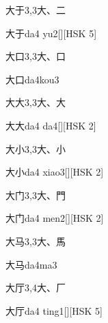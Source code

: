\begin{entry}{大于}{3,3}{⼤、⼆}
  \begin{phonetics}{大于}{da4 yu2}[][HSK 5]
  \end{phonetics}
\end{entry}

\begin{entry}{大口}{3,3}{⼤、⼝}
  \begin{phonetics}{大口}{da4kou3}
  \end{phonetics}
\end{entry}

\begin{entry}{大大}{3,3}{⼤、⼤}
  \begin{phonetics}{大大}{da4 da4}[][HSK 2]
  \end{phonetics}
\end{entry}

\begin{entry}{大小}{3,3}{⼤、⼩}
  \begin{phonetics}{大小}{da4 xiao3}[][HSK 2]
  \end{phonetics}
\end{entry}

\begin{entry}{大门}{3,3}{⼤、⾨}
  \begin{phonetics}{大门}{da4 men2}[][HSK 2]
  \end{phonetics}
\end{entry}

\begin{entry}{大马}{3,3}{⼤、⾺}
  \begin{phonetics}{大马}{da4ma3}
  \end{phonetics}
\end{entry}

\begin{entry}{大厅}{3,4}{⼤、⼚}
  \begin{phonetics}{大厅}{da4 ting1}[][HSK 5]
  \end{phonetics}
\end{entry}

